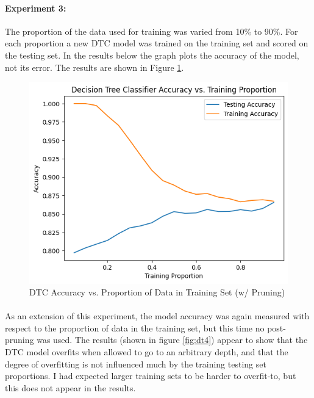 \documentclass[12pt, letterpaper]{article}
\begin{document}
\paragraph*{Experiment 3:} The proportion of the data used for training was
varied from 10\% to 90\%. For each proportion a new DTC model was trained on 
the training set and scored on the testing set. In the results below the graph
plots the accuracy of the model, not its error. The results are shown in
Figure \ref{fig:dt3}.

\begin{figure}[ht]
    \centering
    \includegraphics[width=\textwidth]{dt/dt7.png} %
    \caption{DTC Accuracy vs. Proportion of Data in Training Set (w/ Pruning)}
    \label{fig:dt3}
\end{figure}

\paragraph*{}As an extension of this experiment, the model accuracy was again
measured with respect to the proportion of data in the training set, but this
time no post-pruning was used. The results (shown in figure \ref{fig:dt4})
appear to show that the DTC model overfits when allowed to go to an arbitrary
depth, and that the degree of overfitting is not influenced much by the training \/
testing set proportions. I had expected larger training sets to be harder to overfit-to,
but this does not appear in the results.
\end{document}
